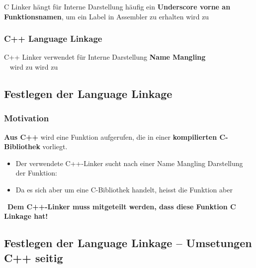 \begin{outline}
    \1 C Linker hängt für Interne Darstellung häufig ein \textbf{Underscore vorne an Funktionsnamen}, um ein Label in Assembler zu erhalten
        \2  wird zu 
\end{outline}


\subsubsection{C++ Language Linkage}

\begin{outline}
    \1 C++ Linker verwendet für Interne Darstellung \textbf{Name Mangling} \\
        \textrightarrow\ 
        \2  wird zu 
        \2  wird zu 
\end{outline}


\subsection{Festlegen der Language Linkage}

\subsubsection{Motivation}

\textbf{Aus C++} wird eine Funktion  aufgerufen, die in einer \textbf{kompilierten C-Bibliothek} vorliegt.

\vspace{0.1cm}

\begin{itemize}
    \item Der verwendete C++-Linker sucht nach einer Name Mangling Darstellung der Funktion: 
    \item Da es sich aber um eine C-Bibliothek handelt, heisst die Funktion aber 
\end{itemize}

\vspace{0.1cm}

\textrightarrow\ \textbf{Dem C++-Linker muss mitgeteilt werden, dass diese Funktion C Linkage hat!}


\subsection{Festlegen der Language Linkage -- Umsetungen C++ seitig}

